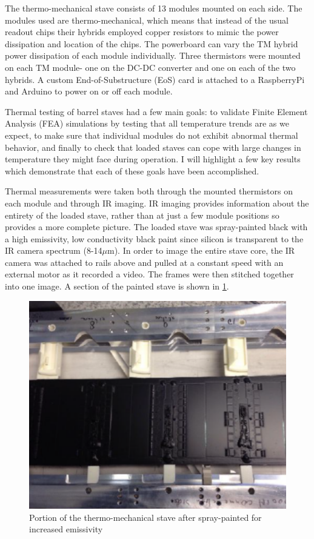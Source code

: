 The thermo-mechanical stave consists of 13 modules mounted on each side. The modules used are thermo-mechanical, which means that instead of the usual readout chips their hybrids employed copper resistors to mimic the power dissipation and location of the chips. The powerboard can vary the TM hybrid power dissipation of each module individually. Three thermistors were mounted on each TM module- one on the DC-DC converter and one on each of the two hybrids. A custom End-of-Substructure (EoS) card is attached to a RaspberryPi and Arduino to power on or off each module.  
 
Thermal testing of barrel staves had a few main goals: to validate Finite Element Analysis (FEA) simulations by testing that all temperature trends are as we expect, to make sure that individual modules do not exhibit abnormal thermal behavior, and finally to check that loaded staves can cope with large changes in temperature they might face during operation. I will highlight a few key results which demonstrate that each of these goals have been accomplished. 

Thermal measurements were taken both through the mounted thermistors on each module and through IR imaging. IR imaging provides information about the entirety of the loaded stave, rather than at just a few module positions so provides a more complete picture. The loaded stave was spray-painted black with a high emissivity, low conductivity black paint since silicon is transparent to the IR camera spectrum (8-14$\mu$m). In order to image the entire stave core, the IR camera was attached to rails above and pulled at a constant speed with an external motor as it recorded a video. The frames were then stitched together into one image. A section of the painted stave is shown in \ref{fig:paintedstave}.  

\begin{figure}[!h]
        \centering
    \includegraphics[width=.4\textwidth]{Pictures/paintedstave.png}
    \caption{Portion of the thermo-mechanical stave after spray-painted for increased emissivity}
    \label{fig:paintedstave}
\end{figure}


